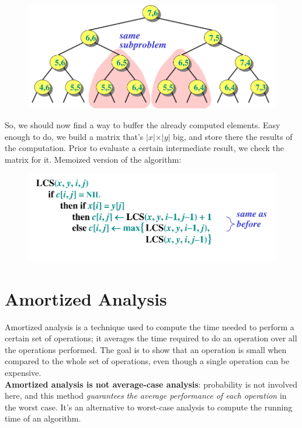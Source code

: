 \documentclass{article}
\begin{document}
			\begin{figure}[H]
				\centering
				\includegraphics[width = \textwidth]{./images/LCStree.png}
			\end{figure}
			So, we should now find a way to buffer the already computed elements. Easy enough to do, we build a matrix that's $\vert x \vert \times \vert y \vert$ big, and store there the results of the computation. Prior to evaluate a certain intermediate result, we check the matrix for it. Memoized version of the algorithm:
			\begin{figure}[H]
				\centering
				\includegraphics[width = \textwidth]{./images/MLCS.png}
			\end{figure}
	
	\section{Amortized Analysis}
		Amortized analysis is a technique used to compute the time needed to perform a certain set of operations; it averages the time required to do an operation over all the operations performed. The goal is to show that an operation is small when compared to the whole set of operations, even though a single operation can be expensive.\\
		\textbf{Amortized analysis is not average-case analysis}: probability is not involved here, and this method \textit{guarantees the average performance of each operation} in the worst case. It's an alternative to worst-case analysis to compute the running time of an algorithm.
\end{document}
